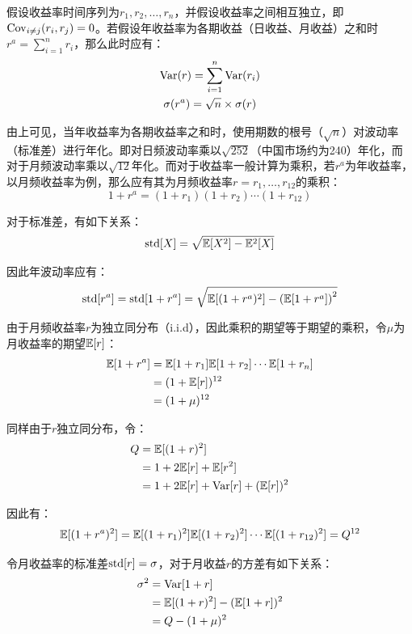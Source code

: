 \documentclass[11pt]{article}
\begin{document}
假设收益率时间序列为$r_1, r_2, \dots, r_n$，并假设收益率之间相互独立，即$\operatorname{Cov}_{i\neq j} (r_i, r_j) = 0$。若假设年收益率为各期收益（日收益、月收益）之和时$r^a = \sum_{i=1}^{n} r_i$，那么此时应有：
\begin{gather*}
    \operatorname{Var}(r) = \sum_{i=1}^{n} \operatorname{Var}(r_i) \\
    \sigma(r^a) = \sqrt{n} \times \sigma(r)
\end{gather*}

由上可见，当年收益率为各期收益率之和时，使用期数的根号（$\sqrt{n}$）对波动率（标准差）进行年化。即对日频波动率乘以$\sqrt{252}$（中国市场约为240）年化，而对于月频波动率乘以$\sqrt{12}$年化。而对于收益率一般计算为乘积，若$r^a$为年收益率，以月频收益率为例，那么应有其为月频收益率$r = r_1,\dots,r_{12}$的乘积：
\begin{equation*}
    1 + r^a = (1+r_1)(1+r_2)\cdots(1+r_{12})
\end{equation*}

对于标准差，有如下关系：
\begin{equation*}
    \text{std}[X] = \sqrt{\mathbb{E}[X^2] - \mathbb{E}^2[X]}
\end{equation*}

因此年波动率应有：
\begin{equation*}
    \text{std}[r^a] = \text{std}[1+r^a] = \sqrt{\mathbb{E}[(1+r^a)^2] - \left(\mathbb{E}[1+r^a]\right)^2}
\end{equation*}

由于月频收益率$r$为独立同分布（i.i.d），因此乘积的期望等于期望的乘积，令$\mu$为月收益率的期望$\mathbb{E}[r]$：
\begin{align*}
    \mathbb{E}[1+r^a] &= \mathbb{E}[1+r_1] \mathbb{E}[1+r_2] \cdots \mathbb{E}[1+r_n] \\
    &= (1+\mathbb{E}[r])^{12} \\
    &= (1+\mu)^{12}
\end{align*}

同样由于$r$独立同分布，令：
\begin{align*}
    Q &= \mathbb{E}[(1+r)^2] \\
    &= 1 + 2\mathbb{E}[r] + \mathbb{E}[r^2] \\
    &= 1 + 2\mathbb{E}[r] + \operatorname{Var}[r] + (\mathbb{E}[r])^2
\end{align*}

因此有：
\begin{equation*}
    \mathbb{E}[(1+r^a)^2] = \mathbb{E}[(1+r_1)^2] \mathbb{E}[(1+r_2)^2] \cdots \mathbb{E}[(1+r_{12})^2] = Q^{12}
\end{equation*}

令月收益率的标准差$\text{std}[r] = \sigma$，对于月收益$r$的方差有如下关系：
\begin{align*}
    \sigma^2 &= \operatorname{Var}[1+r] \\
    &= \mathbb{E}[(1+r)^2] - (\mathbb{E}[1+r])^2 \\
    &= Q - (1+\mu)^2
\end{align*}
\end{document}

